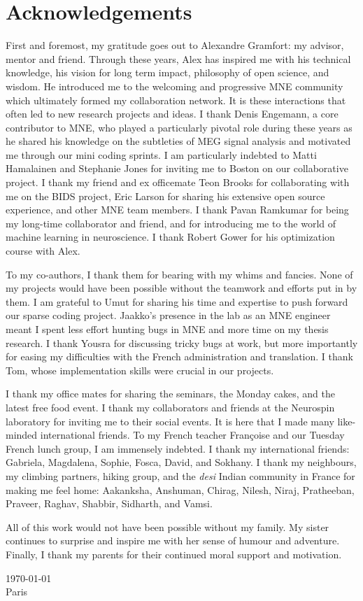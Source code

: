 \chapter*{Acknowledgements}
First and foremost, my gratitude goes out to Alexandre Gramfort: my advisor, mentor and friend. Through these years, Alex has inspired me with his technical knowledge, his vision for long term impact, philosophy of open science, and wisdom. He introduced me to the welcoming and progressive MNE community which ultimately formed my collaboration network. It is these interactions that often led to new research projects and ideas. I thank Denis Engemann, a core contributor to MNE, who played a particularly pivotal role during these years as he shared his knowledge on the subtleties of MEG signal analysis and motivated me through our mini coding sprints. I am particularly indebted to Matti Hamalainen and Stephanie Jones for inviting me to Boston on our collaborative project. I thank my friend and ex officemate Teon Brooks for collaborating with me on the BIDS project, Eric Larson for sharing his extensive open source experience, and other MNE team members. I thank Pavan Ramkumar for being my long-time collaborator and friend, and for introducing me to the world of machine learning in neuroscience. I thank Robert Gower for his optimization course with Alex.

To my co-authors, I thank them for bearing with my whims and fancies. None of my projects would have been possible without the teamwork and efforts put in by them. I am grateful to Umut for sharing his time and expertise to push forward our sparse coding project. Jaakko's presence in the lab as an MNE engineer meant I spent less effort hunting bugs in MNE and more time on my thesis research. I thank Yousra for discussing tricky bugs at work, but more importantly for easing my difficulties with the French administration and translation. I thank Tom, whose implementation skills were crucial in our projects. 

I thank my office mates for sharing the seminars, the Monday cakes, and the latest free food event. I thank my collaborators and friends at the Neurospin laboratory for inviting me to their social events. It is here that I made many like-minded international friends. To my French teacher Françoise and our Tuesday French lunch group, I am immensely indebted. I thank my international friends: Gabriela, Magdalena, Sophie, Fosca, David, and Sokhany. I thank my neighbours, my climbing partners, hiking group, and the \textit{desi} Indian community in France for making me feel home: Aakanksha, Anshuman, Chirag, Nilesh, Niraj, Pratheeban, Praveer, Raghav, Shabbir, Sidharth, and Vamsi.

All of this work would not have been possible without my family. My sister continues to surprise and inspire me with her sense of humour and adventure. Finally, I thank my parents for their continued moral support and motivation.

\today \\
Paris
